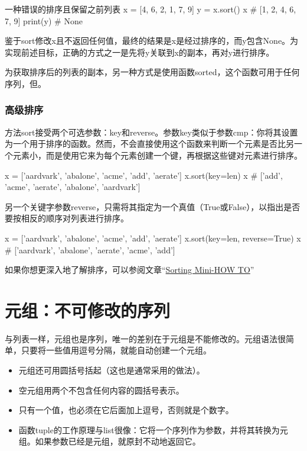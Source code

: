 \begin{py}{一种错误的排序且保留之前列表}
x = [4, 6, 2, 1, 7, 9]
y = x.sort()
x  # [1, 2, 4, 6, 7, 9]
print(y)  # None
\end{py}
鉴于sort修改x且不返回任何值，最终的结果是x是经过排序的，而y包含None。为实现前述目标，正确的方式之一是先将y关联到x的副本，再对y进行排序。

为获取排序后的列表的副本，另一种方式是使用函数sorted，这个函数可用于任何序列，但。

\subsubsection{高级排序}
方法sort接受两个可选参数：key和reverse。参数key类似于参数cmp：你将其设置为一个用于排序的函数。然而，不会直接使用这个函数来判断一个元素是否比另一个元素小，而是使用它来为每个元素创建一个键，再根据这些键对元素进行排序。

\begin{pyc}
x = ['aardvark', 'abalone', 'acme', 'add', 'aerate']
x.sort(key=len)
x  # ['add', 'acme', 'aerate', 'abalone', 'aardvark']
\end{pyc}

另一个关键字参数reverse，只需将其指定为一个真值（True或False），以指出是否要按相反的顺序对列表进行排序。
\begin{pyc}
x = ['aardvark', 'abalone', 'acme', 'add', 'aerate']
x.sort(key=len, reverse=True)
x  # ['aardvark', 'abalone', 'aerate', 'acme', 'add']
\end{pyc}

如果你想更深入地了解排序，可以参阅文章“\href{https://wiki.python.org/moin/HowTo/Sorting}{Sorting Mini-HOW TO}”

\section{元组：不可修改的序列}
与列表一样，元组也是序列，唯一的差别在于元组是不能修改的。元组语法很简单，只要将一些值用逗号分隔，就能自动创建一个元组。
\begin{itemize}
    \item 元组还可用圆括号括起（这也是通常采用的做法）。
    \item 空元组用两个不包含任何内容的圆括号表示。
    \item 只有一个值，也必须在它后面加上逗号，否则就是个数字。
    \item 函数tuple的工作原理与list很像：它将一个序列作为参数，并将其转换为元组。如果参数已经是元组，就原封不动地返回它。
\end{itemize}


